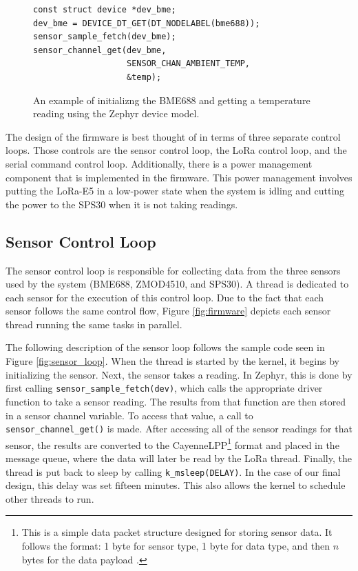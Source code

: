 \documentclass[conference]{IEEEtran}
\begin{document}
\begin{figure}
\begin{Verbatim}[frame=single, language=C, fontsize=\footnotesize]
const struct device *dev_bme;
dev_bme = DEVICE_DT_GET(DT_NODELABEL(bme688));
sensor_sample_fetch(dev_bme);
sensor_channel_get(dev_bme, 
                   SENSOR_CHAN_AMBIENT_TEMP, 
                   &temp);
\end{Verbatim}
\caption{An example of initializng the BME688 and getting a temperature reading using the Zephyr device model.}
\label{fig:dev_bme}
\end{figure}

The design of the firmware is best thought of in terms of three separate control loops. Those controls are the sensor control loop, the LoRa control loop, and the serial command control loop. Additionally, there is a power management component that is implemented in the firmware. This power management involves putting the LoRa-E5 in a low-power state when the system is idling and cutting the power to the SPS30 when it is not taking readings. 

\subsection{Sensor Control Loop}
The sensor control loop is responsible for collecting data from the three sensors used by the system (BME688, ZMOD4510, and SPS30). A thread is dedicated to each sensor for the execution of this control loop. Due to the fact that each sensor follows the same control flow, Figure \ref{fig:firmware} depicts each sensor thread running the same tasks in parallel. 

The following description of the sensor loop follows the sample code seen in Figure \ref{fig:sensor_loop}. When the thread is started by the kernel, it begins by initializing the sensor. Next, the sensor takes a reading. In Zephyr, this is done by first calling \texttt{sensor\_sample\_fetch(dev)}, which calls the appropriate driver function to take a sensor reading. The results from that function are then stored in a sensor channel variable. To access that value, a call to \texttt{sensor\_channel\_get()} is made. After accessing all of the sensor readings for that sensor, the results are converted to the CayenneLPP\footnote{This is a simple data packet structure designed for storing sensor data. It follows the format: 1 byte for sensor type, 1 byte for data type, and then $n$ bytes for the data payload \cite{cayenne}.} format and placed in the message queue, where the data will later be read by the LoRa thread. Finally, the thread is put back to sleep by calling \texttt{k\_msleep(DELAY)}. In the case of our final design, this delay was set fifteen minutes. This also allows the kernel to schedule other threads to run. 
\end{document}
